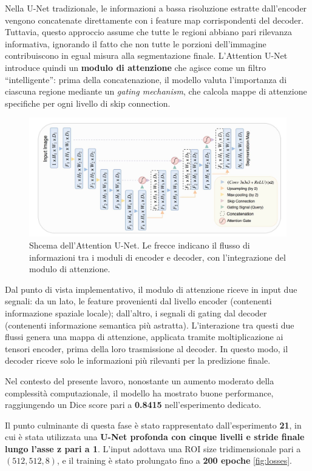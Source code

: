 Nella U-Net tradizionale, le informazioni a bassa risoluzione estratte dall’encoder vengono concatenate direttamente con i feature map corrispondenti del decoder. Tuttavia, questo approccio assume che tutte le regioni abbiano pari rilevanza informativa, ignorando il fatto che non tutte le porzioni dell’immagine contribuiscono in egual misura alla segmentazione finale. L’Attention U-Net introduce quindi un \textbf{modulo di attenzione} che agisce come un filtro “intelligente”: prima della concatenazione, il modello valuta l’importanza di ciascuna regione mediante un \textit{gating mechanism}, che calcola mappe di attenzione specifiche per ogni livello di skip connection.

\begin{figure}[H] 
  	\centering 
 	\includegraphics[width=.8\textwidth]{images/2025-07-22-14-33-52.png} 
    \caption{Shcema dell’Attention U-Net. Le frecce indicano il flusso di informazioni tra i moduli di encoder e decoder, con l’integrazione del modulo di attenzione.}
    \label{fig:attention_unet}
 \end{figure} 
Dal punto di vista implementativo, il modulo di attenzione riceve in input due segnali: da un lato, le feature provenienti dal livello encoder (contenenti informazione spaziale locale); dall’altro, i segnali di gating dal decoder (contenenti informazione semantica più astratta). L’interazione tra questi due flussi genera una mappa di attenzione, applicata tramite moltiplicazione ai tensori encoder, prima della loro trasmissione al decoder. In questo modo, il decoder riceve solo le informazioni più rilevanti per la predizione finale.

Nel contesto del presente lavoro, nonostante un aumento moderato della complessità computazionale, il modello ha mostrato buone performance, raggiungendo un Dice score pari a \textbf{0.8415} nell’esperimento dedicato.


Il punto culminante di questa fase è stato rappresentato dall’esperimento \textbf{21}, in cui è stata utilizzata una \textbf{U-Net profonda con cinque livelli e stride finale lungo l’asse z pari a 1}. L’input adottava una ROI size tridimensionale pari a $(512, 512, 8)$, e il training è stato prolungato fino a \textbf{200 epoche} \ref{fig:losses}. 


